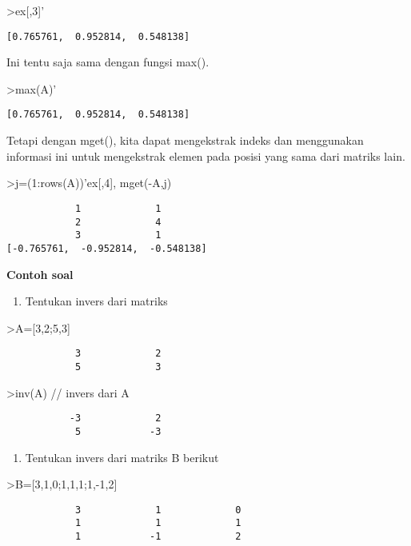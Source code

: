 \documentclass[
]{book}
\providecommand{\tightlist}{%
  \setlength{\itemsep}{0pt}\setlength{\parskip}{0pt}}
\begin{document}
\textgreater ex{[},3{]}'

\begin{verbatim}
[0.765761,  0.952814,  0.548138]
\end{verbatim}

Ini tentu saja sama dengan fungsi max().

\textgreater max(A)'

\begin{verbatim}
[0.765761,  0.952814,  0.548138]
\end{verbatim}

Tetapi dengan mget(), kita dapat mengekstrak indeks dan menggunakan informasi ini untuk mengekstrak elemen pada posisi yang sama dari matriks lain.

\textgreater j=(1:rows(A))'\textbar ex{[},4{]}, mget(-A,j)

\begin{verbatim}
            1             1 
            2             4 
            3             1 
[-0.765761,  -0.952814,  -0.548138]
\end{verbatim}

\textbf{Contoh soal}

\begin{enumerate}
\def\labelenumi{\arabic{enumi}.}
\tightlist
\item
  Tentukan invers dari matriks
\end{enumerate}

\textgreater A={[}3,2;5,3{]}

\begin{verbatim}
            3             2 
            5             3 
\end{verbatim}

\textgreater inv(A) // invers dari A

\begin{verbatim}
           -3             2 
            5            -3 
\end{verbatim}

\begin{enumerate}
\def\labelenumi{\arabic{enumi}.}
\setcounter{enumi}{1}
\tightlist
\item
  Tentukan invers dari matriks B berikut
\end{enumerate}

\textgreater B={[}3,1,0;1,1,1;1,-1,2{]}

\begin{verbatim}
            3             1             0 
            1             1             1 
            1            -1             2 
\end{verbatim}
\end{document}
